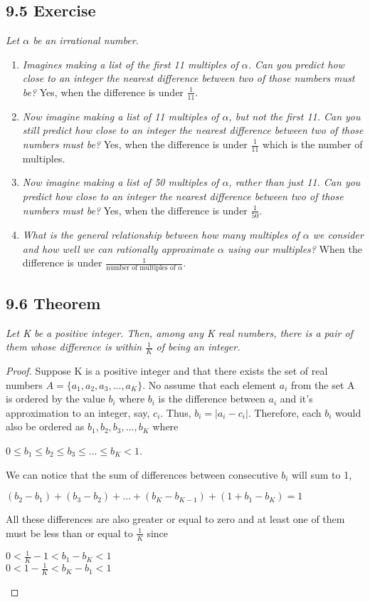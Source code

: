 \documentclass{article}
\begin{document}
\subsection*{9.5 Exercise} 
\quad \textit{Let $\alpha$ be an irrational number.}
\begin{enumerate}
    \item \textit{Imagines making a list of the first 11 multiples of $\alpha$. Can you predict how close to an integer the nearest difference between two of those numbers must be?} Yes, when the difference is under $\frac{1}{11}$.
    \item \textit{Now imagine making a list of 11 multiples of $\alpha$, but not the first 11. Can you still predict how close to an integer the nearest difference between two of those numbers must be?} Yes, when the difference is under $\frac{1}{11}$ which is the number of multiples.
    \item \textit{Now imagine making a list of 50 multiples of $\alpha$, rather than just 11. Can you predict how close to an integer the nearest difference between two of those numbers must be?} Yes, when the difference is under $\frac{1}{50}$.
    \item \textit{What is the general relationship between how many multiples of $\alpha$ we consider and how well we can rationally approximate $\alpha$ using our multiples?} When the difference is under $\frac{1}{\text{number of multiples of } \alpha}$.
\end{enumerate}

\subsection*{9.6 Theorem} 
\quad \textit{Let K be a positive integer. Then, among any K real numbers, there is a pair of them whose difference is within $\frac{1}{K}$ of being an integer.}

\begin{proof}
Suppose K is a positive integer and that there exists the set of real numbers $A = \{a_1, a_2, a_3,...,a_K\}$. No assume that each element $a_i$ from the set A is ordered by the value $b_i$ where $b_i$ is the difference between $a_i$ and it's approximation to an integer, say, $c_i$. Thus, $b_i = |a_i - c_i|$. Therefore, each $b_i$ would also be ordered as $b_1,b_2,b_3,...,b_K$ where 
\begin{center}
    $0 \leq b_1 \leq b_2 \leq b_3 \leq ... \leq b_K < 1$. 
\end{center}
We can notice that the sum of differences between consecutive $b_i$ will sum to 1,
\begin{center}
    $(b_2 - b_1) + (b_3 - b_2) + ... + (b_K - b_{K-1}) + (1 + b_1 - b_K) = 1$
\end{center}
All these differences are also greater or equal to zero and at least one of them must be less than or equal to $\frac{1}{K}$ since 
\begin{center}
    $0 < \frac{1}{K} - 1< b_1 - b_K < 1$\\
    $0 < 1 - \frac{1}{K}< b_K - b_1 < 1$
\end{center}
\end{proof}
\end{document}
